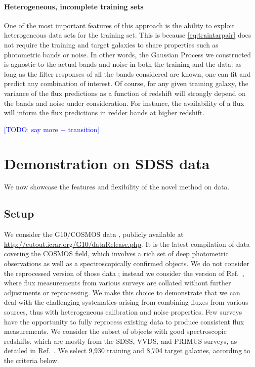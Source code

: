 \documentclass[aps,prd,showpacs,superscriptaddress,groupedaddress]{revtex4}  %
\newcommand{\todo}[1]{\textcolor{blue}{[TODO: #1]}}
\begin{document}
\paragraph{Heterogeneous, incomplete training sets} 
One of the most important features of this approach is the ability to exploit heterogeneous data sets for the training set.
This is because \eqref{eq:traintarpair} does not require the training and target galaxies to share properties such as photometric bands or noise.
In other words, the Gaussian Process we constructed is agnostic to the actual bands and noise in both the training and the data: as long as the filter responses of all the bands considered are known, one can fit and predict any combination of interest.
Of course, for any given training galaxy, the variance of the flux predictions as a function of redshift will strongly depend on the bands and noise under consideration. 
For instance, the availability of a flux will inform the flux predictions in redder bands at higher redshift.

\todo{say more + transition}


\section{Demonstration on SDSS data}\label{sec:data}

We now showcase the features and flexibility of the novel method on data. 

\subsection{Setup}

We consider the G10/COSMOS data \citep{Davies:2015}, publicly available at \url{http://cutout.icrar.org/G10/dataRelease.php}. 
It is the latest compilation of data covering the COSMOS field, which involves a rich set of deep photometric observations as well as a spectroscopically confirmed objects.
We do not consider the reprocessed version of those data \citep{Andrews:2016}; instead we consider the version of Ref.~\citep{Davies:2015}, where flux measurements from various surveys are collated without further adjustments or reprocessing.
We make this choice to demonstrate that we can deal with the challenging systematics arising from combining fluxes from various sources, thus with heterogeneous calibration and noise properties.
Few surveys have the opportunity to fully reprocess existing data to produce consistent flux measurements.  
We consider the subset of objects with good spectroscopic redshifts, which are mostly from the SDSS, VVDS, and PRIMUS surveys, as detailed in Ref.~\citep{Davies:2015}.
We select 9,930 training and 8,704 target galaxies, according to the criteria below.
\end{document}
